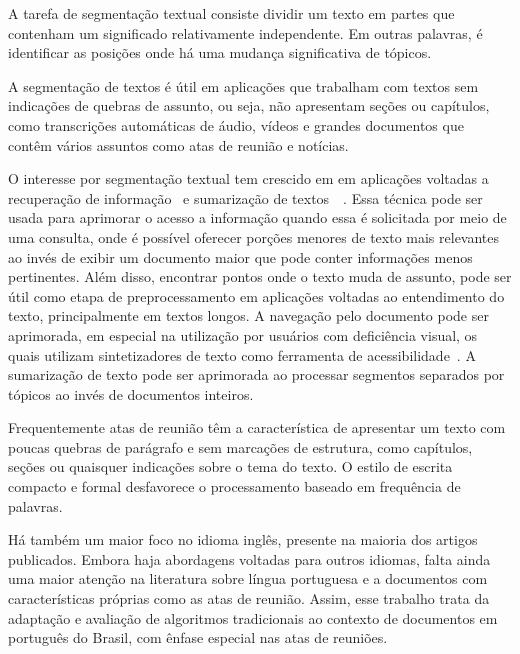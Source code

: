 A tarefa de segmentação textual consiste dividir um texto em partes que contenham um significado relativamente independente. Em outras palavras, é identificar as posições onde há uma mudança significativa de tópicos. 

A segmentação de textos é útil em aplicações que trabalham com textos sem indicações de quebras de assunto, ou seja, não apresentam seções ou capítulos, como transcrições automáticas de áudio, vídeos e grandes documentos que contêm vários assuntos como atas de reunião e notícias.


O interesse por segmentação textual tem crescido em em aplicações voltadas a recuperação de informação~\cite{Reynar1999} %
e sumarização de textos~\cite{Boguraev2000}~\cite{Boguraev2000b}. %
Essa técnica pode ser usada para aprimorar o acesso a informação quando essa é solicitada por meio de uma consulta, onde é possível oferecer porções menores de texto mais relevantes ao invés de exibir um documento maior que pode conter informações menos pertinentes. 
%
Além disso, encontrar pontos onde o texto muda de assunto, pode ser útil como etapa de preprocessamento em aplicações voltadas ao entendimento do texto, principalmente em textos longos.
%
A navegação pelo documento pode ser aprimorada, em especial na utilização por usuários com deficiência visual, os quais utilizam  sintetizadores de texto como ferramenta de acessibilidade~\cite{Choi2000}. 
%
A sumarização de texto pode ser aprimorada ao processar segmentos separados por tópicos ao invés de documentos inteiros. 



Frequentemente atas de reunião têm a característica de apresentar um texto com poucas quebras de parágrafo e sem marcações de estrutura, como capítulos, seções ou quaisquer indicações sobre o tema do texto. O estilo de escrita compacto e formal desfavorece o processamento baseado em frequência de palavras.


Há também um maior foco no idioma inglês, presente na maioria dos artigos publicados. Embora haja abordagens voltadas para outros idiomas, falta ainda uma maior atenção na literatura sobre língua portuguesa e a documentos com características próprias como as atas de reunião.
%
%
%
Assim, esse trabalho trata da adaptação e avaliação de algoritmos tradicionais ao contexto de documentos em português do Brasil, com ênfase especial nas atas de reuniões.

